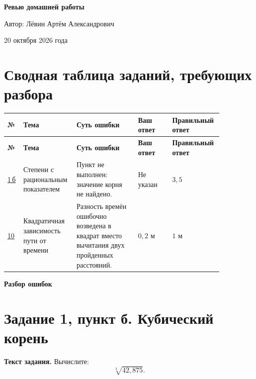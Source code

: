 \documentclass[12pt,a4paper]{article}
\begin{document}
\RaggedRight
\thispagestyle{empty}
\vspace*{0.31\textheight}
\begin{center}
{\Huge\bfseries Ревью домашней работы\par}
\vspace{22mm}
{\large Автор: Лёвин Артём Александрович\par}
\vspace{6mm}
{\large 20 октября 2026 года\par}
\end{center}
\vfill
\begin{center}
\end{center}
\newpage
\section*{Сводная таблица заданий, требующих разбора}
\small
\begin{longtable}{@{}p{0.070\linewidth}p{0.193\linewidth}p{0.271\linewidth}p{0.155\linewidth}p{0.175\linewidth}@{}}
\toprule
\textbf{№} & \textbf{Тема} & \textbf{Суть ошибки} & \textbf{Ваш ответ} & \textbf{Правильный ответ}\\
\midrule
\endfirsthead
\toprule
\textbf{№} & \textbf{Тема} & \textbf{Суть ошибки} & \textbf{Ваш ответ} & \textbf{Правильный ответ}\\
\midrule
\endhead
\hyperref[task:1b]{1\,б} & Степени с рациональным показателем & Пункт не выполнен: значение корня не найдено. & Не указан & $3{,}5$\\
\addlinespace[4pt]
\hyperref[task:10]{10} & Квадратичная зависимость пути от времени & Разность времён ошибочно возведена в квадрат вместо вычитания двух пройденных расстояний. & $0{,}2$ м & $1$ м\\
\bottomrule
\end{longtable}
\normalsize
\newpage
\thispagestyle{empty}
\vspace*{\fill}
\begin{center}
{\LARGE\bfseries Разбор ошибок}
\end{center}
\vspace*{\fill}
\newpage
{}\label{task:1b}
\section*{Задание 1, пункт б. Кубический корень}
\textbf{Текст задания.} Вычислите:
\[
\sqrt[3]{42{,}875}.
\]
\end{document}
